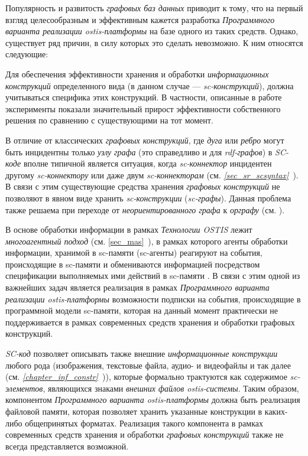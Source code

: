Популярность и развитость \textit{графовых баз данных} приводит к тому, что на первый взгляд целесообразным и эффективным кажется разработка \textit{Программного варианта реализации ostis-платформы} на базе одного из таких средств. Однако, существует ряд причин, в силу которых это сделать невозможно. К ним относятся следующие:
\begin{textitemize}
	\item Для обеспечения эффективности хранения и обработки \textit{информационных конструкций} определенного вида (в данном случае --- \textit{sc-конструкций}), должна учитываться специфика этих конструкций. В частности, описанные в работе  эксперименты показали значительный прирост эффективности собственного решения по сравнению с существующими на тот момент.
	\item В отличие от классических \textit{графовых конструкций}, где \textit{дуга} или \textit{ребро} могут быть инцидентны только \textit{узлу} \textit{графа} (это справедливо и для \textit{rdf-графов}) в \textit{SC-коде} вполне типичной является ситуация, когда \textit{sc-коннектор} инцидентен другому \textit{sc-коннектору} или даже двум \textit{sc-коннекторам} (см. \textit{\ref{sec_sr_scsyntax}~}). В связи с этим существующие средства хранения \textit{графовых конструкций} не позволяют в явном виде хранить \textit{sc-конструкции} (\textit{sc-графы}). Данная проблема также решаема при переходе от \textit{неориентированного графа} к \textit{орграфу} (см. ).
	\item В основе обработки информации в рамках \textit{Технологии OSTIS} лежит \textit{многоагентный подход} (см. \ref{sec_mas}~), в рамках которого агенты обработки информации, хранимой в sc-памяти (sc-агенты) реагируют на события, происходящие в sc-памяти и обмениваются информацией посредством спецификации выполняемых ими действий в sc-памяти . В связи с этим одной из важнейших задач является реализация в рамках \textit{Программного варианта реализации ostis-платформы} возможности подписки на события, происходящие в программной модели sc-памяти, которая на данный момент практически не поддерживается в рамках современных средств хранения и обработки графовых конструкций.
	\item \textit{SC-код} позволяет описывать также внешние \textit{информационные конструкции} любого рода (изображения, текстовые файла, аудио- и видеофайлы и так далее (см. \textit{\ref{chapter_inf_constr}~})), которые формально трактуются как содержимое \textit{sc-элементов}, являющихся знаками \textit{внешних файлов ostis-системы}. Таким образом, компонентом \textit{Программного варианта ostis-платформы} должна быть реализация файловой памяти, которая позволяет хранить указанные конструкции в каких-либо общепринятых форматах. Реализация такого компонента в рамках современных средств хранения и обработки \textit{графовых конструкций} также не всегда представляется возможной.
\end{textitemize}

